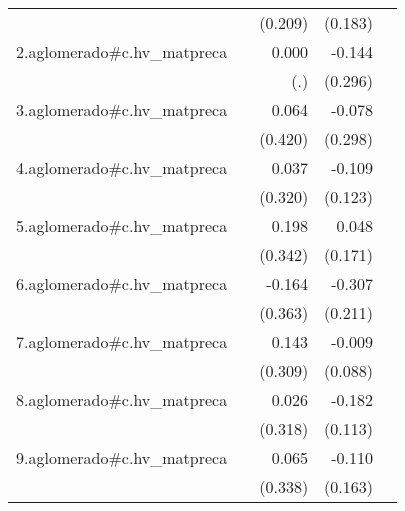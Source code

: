 {\begin{longtable}{l*{4}{D{.}{.}{-1}}}
            &                     &     (0.209)         &     (0.183)         &                     \\
\addlinespace
2.aglomerado#c.hv\_matpreca&                     &       0.000         &      -0.144         &                     \\
            &                     &         (.)         &     (0.296)         &                     \\
\addlinespace
3.aglomerado#c.hv\_matpreca&                     &       0.064         &      -0.078         &                     \\
            &                     &     (0.420)         &     (0.298)         &                     \\
\addlinespace
4.aglomerado#c.hv\_matpreca&                     &       0.037         &      -0.109         &                     \\
            &                     &     (0.320)         &     (0.123)         &                     \\
\addlinespace
5.aglomerado#c.hv\_matpreca&                     &       0.198         &       0.048         &                     \\
            &                     &     (0.342)         &     (0.171)         &                     \\
\addlinespace
6.aglomerado#c.hv\_matpreca&                     &      -0.164         &      -0.307         &                     \\
            &                     &     (0.363)         &     (0.211)         &                     \\
\addlinespace
7.aglomerado#c.hv\_matpreca&                     &       0.143         &      -0.009         &                     \\
            &                     &     (0.309)         &     (0.088)         &                     \\
\addlinespace
8.aglomerado#c.hv\_matpreca&                     &       0.026         &      -0.182         &                     \\
            &                     &     (0.318)         &     (0.113)         &                     \\
\addlinespace
9.aglomerado#c.hv\_matpreca&                     &       0.065         &      -0.110         &                     \\
            &                     &     (0.338)         &     (0.163)         &                     \\

\end{longtable}}

